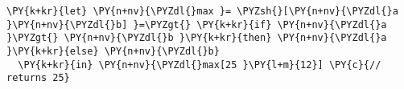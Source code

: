 \begin{Verbatim}[commandchars=\\\{\}]
\PY{k+kr}{let} \PY{n+nv}{\PYZdl{}max }= \PYZsh{}[\PY{n+nv}{\PYZdl{}a }\PY{n+nv}{\PYZdl{}b] }=\PYZgt{} \PY{k+kr}{if} \PY{n+nv}{\PYZdl{}a }\PYZgt{} \PY{n+nv}{\PYZdl{}b }\PY{k+kr}{then} \PY{n+nv}{\PYZdl{}a }\PY{k+kr}{else} \PY{n+nv}{\PYZdl{}b}
  \PY{k+kr}{in} \PY{n+nv}{\PYZdl{}max[25 }\PY{l+m}{12}] \PY{c}{// returns 25}
\end{Verbatim}
